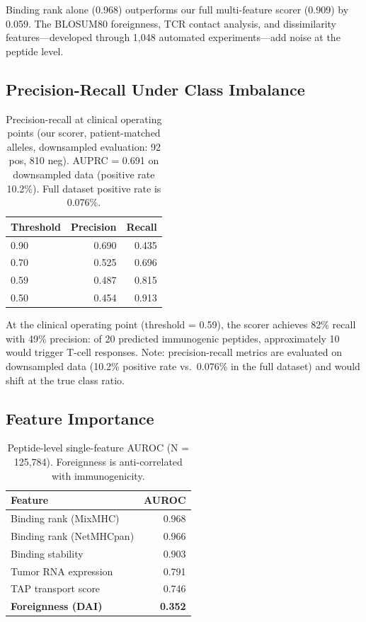 \documentclass[11pt,twocolumn]{article}
\begin{document}
Binding rank alone (0.968) outperforms our full multi-feature scorer (0.909) by 0.059. The BLOSUM80 foreignness, TCR contact analysis, and dissimilarity features---developed through 1,048 automated experiments---add noise at the peptide level.

\subsection{Precision-Recall Under Class Imbalance}

\begin{table}[ht]
\centering
\footnotesize
\begin{tabular}{@{}lrr@{}}
\toprule
Threshold & Precision & Recall \\
\midrule
0.90 & 0.690 & 0.435 \\
0.70 & 0.525 & 0.696 \\
0.59 & 0.487 & 0.815 \\
0.50 & 0.454 & 0.913 \\
\bottomrule
\end{tabular}
\caption{Precision-recall at clinical operating points (our scorer, patient-matched alleles, downsampled evaluation: 92 pos, 810 neg). AUPRC = 0.691 on downsampled data (positive rate 10.2\%). Full dataset positive rate is 0.076\%.}
\end{table}

At the clinical operating point (threshold = 0.59), the scorer achieves 82\% recall with 49\% precision: of 20 predicted immunogenic peptides, approximately 10 would trigger T-cell responses. Note: precision-recall metrics are evaluated on downsampled data (10.2\% positive rate vs.\ 0.076\% in the full dataset) and would shift at the true class ratio.

\subsection{Feature Importance}

\begin{table}[ht]
\centering
\footnotesize
\begin{tabular}{@{}lr@{}}
\toprule
Feature & AUROC \\
\midrule
Binding rank (MixMHC) & 0.968 \\
Binding rank (NetMHCpan) & 0.966 \\
Binding stability & 0.903 \\
Tumor RNA expression & 0.791 \\
TAP transport score & 0.746 \\
\textbf{Foreignness (DAI)} & \textbf{0.352} \\
\bottomrule
\end{tabular}
\caption{Peptide-level single-feature AUROC (N = 125,784). Foreignness is anti-correlated with immunogenicity.}
\end{table}
\end{document}
